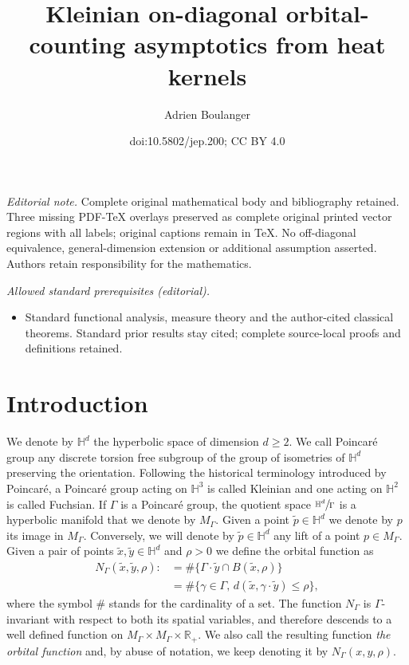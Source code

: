 \documentclass[10pt]{amsart}
\title{Kleinian on-diagonal orbital-counting asymptotics from heat kernels}
\author{Adrien Boulanger}
\date{doi:10.5802/jep.200; CC BY 4.0}
\theoremstyle{plain}
\theoremstyle{definition}
\newcommand{\HH}{\mathbb{H}}
\newcommand{\RR}{\mathbb{R}}
\let\quotient\sfrac
\providecommand{\mainmatter}{}\providecommand{\backmatter}{}
\begin{document}
\maketitle
\noindent\textit{Editorial note.} Complete original mathematical body and bibliography retained. Three missing PDF-TeX overlays preserved as complete original printed vector regions with all labels; original captions remain in TeX. No off-diagonal equivalence, general-dimension extension or additional assumption asserted. Authors retain responsibility for the mathematics.\par\medskip
\noindent\textit{Allowed standard prerequisites (editorial).}\begin{itemize}
\item Standard functional analysis, measure theory and the author-cited classical theorems. Standard prior results stay cited; complete source-local proofs and definitions retained.
\end{itemize}\medskip
\tableofcontents
\mainmatter

\section{Introduction}
We denote by $\HH^d$ the hyperbolic space of dimension $d \ge 2$. We call Poincaré group any discrete torsion free subgroup of the group of isometries of $\HH^d$ preserving the orientation. Following the historical terminology introduced by Poincaré, a Poincaré group acting on $\HH^3$ is called Kleinian and one acting on $\HH^2$ is called Fuchsian. If $\Gamma$ is a Poincaré group, the quotient space $\quotient{\HH^d}{\Gamma}$ is a hyperbolic manifold that we denote by $M_{\Gamma}$. Given a point $\tilde{p} \in \HH^d$ we denote by $p$ its image in $M_{\Gamma}$. Conversely, we will denote by $\tilde{p} \in \HH^d$ any lift of a point $p \in M_{\Gamma}$. Given a pair of points $\tilde{x},\tilde{y} \in \HH^d$ and $\rho > 0$ we define the orbital function as
\begin{align*}
N_{\Gamma}(\tilde{x},\tilde{y},\rho) : & = \# \{ \Gamma \cdot \tilde{y} \cap B(\tilde{x}, \rho) \} \\
& = \# \{ \gamma \in \Gamma, \,d(\tilde{x}, \gamma \cdot \tilde{y}) \le \rho \},
\end{align*}
where the symbol $\#$ stands for the cardinality of a set. The function $N_{\Gamma}$ is $\Gamma$-invariant with respect to both its spatial variables, and therefore descends to a well defined function on $M_{\Gamma} \times M_{\Gamma} \times \RR_+$. We also call the resulting function \emph{the orbital function} and, by abuse of notation, we keep denoting it by $N_{\Gamma}(x,y,\rho)$.
\end{document}
